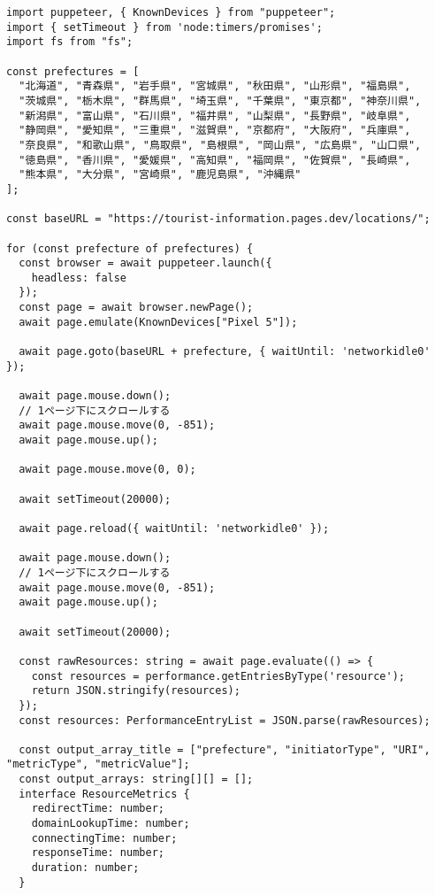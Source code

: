 \begin{lstlisting}[caption={PuppeteerとResource Timing APIを用いたスクロール時の画像の読み込み時間の測定},label={lst:PuppeteerとResource Timing APIを用いたスクロール時の画像の読み込み時間の測定}]
import puppeteer, { KnownDevices } from "puppeteer";
import { setTimeout } from 'node:timers/promises';
import fs from "fs";

const prefectures = [
  "北海道", "青森県", "岩手県", "宮城県", "秋田県", "山形県", "福島県",
  "茨城県", "栃木県", "群馬県", "埼玉県", "千葉県", "東京都", "神奈川県",
  "新潟県", "富山県", "石川県", "福井県", "山梨県", "長野県", "岐阜県",
  "静岡県", "愛知県", "三重県", "滋賀県", "京都府", "大阪府", "兵庫県",
  "奈良県", "和歌山県", "鳥取県", "島根県", "岡山県", "広島県", "山口県",
  "徳島県", "香川県", "愛媛県", "高知県", "福岡県", "佐賀県", "長崎県",
  "熊本県", "大分県", "宮崎県", "鹿児島県", "沖縄県"
];

const baseURL = "https://tourist-information.pages.dev/locations/";

for (const prefecture of prefectures) {
  const browser = await puppeteer.launch({
    headless: false
  });
  const page = await browser.newPage();
  await page.emulate(KnownDevices["Pixel 5"]);

  await page.goto(baseURL + prefecture, { waitUntil: 'networkidle0' });

  await page.mouse.down();
  // 1ページ下にスクロールする
  await page.mouse.move(0, -851);
  await page.mouse.up();

  await page.mouse.move(0, 0);

  await setTimeout(20000);

  await page.reload({ waitUntil: 'networkidle0' });

  await page.mouse.down();
  // 1ページ下にスクロールする
  await page.mouse.move(0, -851);
  await page.mouse.up();

  await setTimeout(20000);

  const rawResources: string = await page.evaluate(() => {
    const resources = performance.getEntriesByType('resource');
    return JSON.stringify(resources);
  });
  const resources: PerformanceEntryList = JSON.parse(rawResources);

  const output_array_title = ["prefecture", "initiatorType", "URI", "metricType", "metricValue"];
  const output_arrays: string[][] = [];
  interface ResourceMetrics {
    redirectTime: number;
    domainLookupTime: number;
    connectingTime: number;
    responseTime: number;
    duration: number;
  }


\end{lstlisting}
